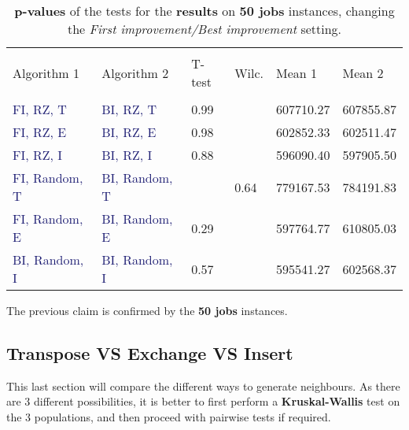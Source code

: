 \documentclass[
12pt,
a4paper,
oneside,
headinclude,
footinclude]{article}
\theoremstyle{definition} %
\begin{document}
\begin{table}[H]
    \begin{tabular}{l l l l l l} %
        \hline
        \hline 
        \\[-1.5ex]
        \textcolor{BrickRed}{Algorithm 1} & \textcolor{BrickRed}{Algorithm 2} & \textcolor{BrickRed}{T-test} & \textcolor{BrickRed}{Wilc.} & \textcolor{BrickRed}{Mean 1} & \textcolor{BrickRed}{Mean 2}\\ [0.5ex]
        \hline %
        \\[-1.5ex]
                
        \textcolor{MidnightBlue}{FI, RZ, T}     & \textcolor{MidnightBlue}{BI, RZ, T}     & 0.99 &  &  607710.27 & 607855.87 \\ 
        \textcolor{MidnightBlue}{FI, RZ, E}     & \textcolor{MidnightBlue}{BI, RZ, E}     & 0.98 &  &  602852.33 & 602511.47 \\ 
        \textcolor{MidnightBlue}{FI, RZ, I}     & \textcolor{MidnightBlue}{BI, RZ, I}     & 0.88 &  & 596090.40 & 597905.50 \\ 
        \textcolor{MidnightBlue}{FI, Random, T} & \textcolor{MidnightBlue}{BI, Random, T} &  & 0.64 &  779167.53 & 784191.83 \\ 
        \textcolor{MidnightBlue}{FI, Random, E} & \textcolor{MidnightBlue}{BI, Random, E} & 0.29 &  &  597764.77 & 610805.03 \\ 
        \textcolor{MidnightBlue}{BI, Random, I} & \textcolor{MidnightBlue}{BI, Random, I} & 0.57 &  &  595541.27 & 602568.37 \\ 
        [1ex] %
        \hline %
    \end{tabular}
    \caption{\label{tab:ii-ty50res}\textbf{p-values} of the tests for the \textbf{results} on \textbf{50 jobs} instances, changing the \textit{First improvement/Best improvement} setting.}
\end{table} 


The previous claim is confirmed by the \textbf{50 jobs} instances.



\subsection{Transpose VS Exchange VS Insert}
This last section will compare the different ways to generate neighbours. As there are 3 different possibilities, it is better to first perform a \textbf{Kruskal-Wallis} test on the 3 populations, and then proceed with pairwise tests if required.
\end{document}
